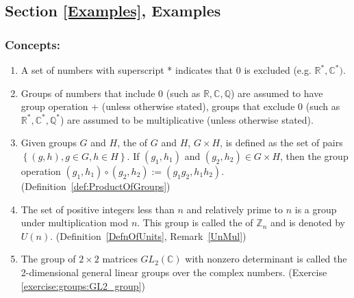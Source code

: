 \subsection*{Section \ref{Examples}, Examples}
\subsubsection*{Concepts:}
\begin{enumerate}
\item
A set of numbers  with superscript * indicates that 0 is excluded  (e.g. $\mathbb{R}^{\ast},\mathbb{C}^{\ast})$.
\item
Groups of numbers that include 0 (such as ${\mathbb R}, {\mathbb C}, {\mathbb Q}$) are assumed to have group operation + (unless otherwise stated),  groups that exclude 0 (such as ${\mathbb R}^{\ast}, {\mathbb C}^{\ast}, {\mathbb Q}^{\ast}$) are assumed to be multiplicative (unless otherwise stated).
\item
Given groups $G$ and $H$, the  of $G$ and $H$, $G \times H$, is defined as the set of pairs $\left\{(g,h), g \in G, h \in H \right\}$.  If $(g_1, h_1)$ and $(g_2, h_2) \in G \times H$, then the group operation $(g_1, h_1) \circ (g_2, h_2) := (g_1g_2, h_1h_2)$. (Definition~\ref{def:ProductOfGroups})
\item
The set of positive integers less than $n$ and relatively prime to $n$ is a group under multiplication mod $n$. This group is called the  of ${\mathbb Z}_n$  and is denoted by $U(n)$.  (Definition~\ref{DefnOfUnits}, Remark~\ref{UnMul})
\item
The group of $2 \times 2$ matrices $GL_2({\mathbb C})$ with nonzero determinant is called the 2-dimensional general linear groups over the complex numbers. (Exercise \ref{exercise:groups:GL2_group})
\end{enumerate}

